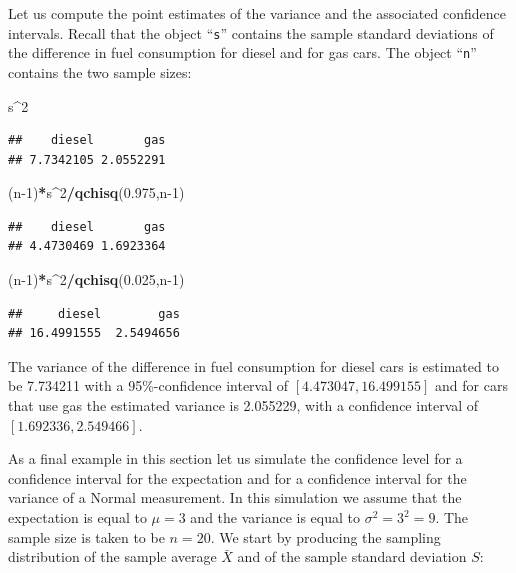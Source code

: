 \documentclass[]{krantz}
\makeatletter
\newenvironment{Shaded}{\begin{snugshade}}{\end{snugshade}}
\newcommand{\DecValTok}[1]{\textcolor[rgb]{0.00,0.00,0.81}{#1}}
\newcommand{\FloatTok}[1]{\textcolor[rgb]{0.00,0.00,0.81}{#1}}
\newcommand{\KeywordTok}[1]{\textcolor[rgb]{0.13,0.29,0.53}{\textbf{#1}}}
\newcommand{\NormalTok}[1]{#1}
\newcommand{\OperatorTok}[1]{\textcolor[rgb]{0.81,0.36,0.00}{\textbf{#1}}}
\newenvironment{kframe}{%
\medskip{}
\setlength{\fboxsep}{.8em}
 \def\at@end@of@kframe{}%
 \ifinner\ifhmode%
  \def\at@end@of@kframe{\end{minipage}}%
  \begin{minipage}{\columnwidth}%
 \fi\fi%
 \def\FrameCommand##1{\hskip\@totalleftmargin \hskip-\fboxsep
 \colorbox{shadecolor}{##1}\hskip-\fboxsep
     \hskip-\linewidth \hskip-\@totalleftmargin \hskip\columnwidth}%
 \MakeFramed {\advance\hsize-\width
   \@totalleftmargin\z@ \linewidth\hsize
   \@setminipage}}%
 {\par\unskip\endMakeFramed%
 \at@end@of@kframe}
\renewenvironment{Shaded}{\begin{kframe}}{\end{kframe}}
\theoremstyle{definition}
\theoremstyle{definition}
\theoremstyle{definition}
\theoremstyle{remark}
\makeatother
\begin{document}
Let us compute the point estimates of the variance and the associated
confidence intervals. Recall that the object ``\texttt{s}'' contains the sample
standard deviations of the difference in fuel consumption for diesel and
for gas cars. The object ``\texttt{n}'' contains the two sample sizes:

\begin{Shaded}
\begin{Highlighting}[]
\NormalTok{s}\OperatorTok{^}\DecValTok{2}
\end{Highlighting}
\end{Shaded}

\begin{verbatim}
##    diesel       gas 
## 7.7342105 2.0552291
\end{verbatim}

\begin{Shaded}
\begin{Highlighting}[]
\NormalTok{(n}\DecValTok{-1}\NormalTok{)}\OperatorTok{*}\NormalTok{s}\OperatorTok{^}\DecValTok{2}\OperatorTok{/}\KeywordTok{qchisq}\NormalTok{(}\FloatTok{0.975}\NormalTok{,n}\DecValTok{-1}\NormalTok{)}
\end{Highlighting}
\end{Shaded}

\begin{verbatim}
##    diesel       gas 
## 4.4730469 1.6923364
\end{verbatim}

\begin{Shaded}
\begin{Highlighting}[]
\NormalTok{(n}\DecValTok{-1}\NormalTok{)}\OperatorTok{*}\NormalTok{s}\OperatorTok{^}\DecValTok{2}\OperatorTok{/}\KeywordTok{qchisq}\NormalTok{(}\FloatTok{0.025}\NormalTok{,n}\DecValTok{-1}\NormalTok{)}
\end{Highlighting}
\end{Shaded}

\begin{verbatim}
##     diesel        gas 
## 16.4991555  2.5494656
\end{verbatim}

The variance of the difference in fuel consumption for diesel cars is
estimated to be 7.734211 with a 95\%-confidence interval of
\([4.473047, 16.499155]\) and for cars that use gas the estimated variance
is 2.055229, with a confidence interval of \([1.692336, 2.549466]\).

As a final example in this section let us simulate the confidence level
for a confidence interval for the expectation and for a confidence
interval for the variance of a Normal measurement. In this simulation we
assume that the expectation is equal to \(\mu = 3\) and the variance is
equal to \(\sigma^2 = 3^2 = 9\). The sample size is taken to be \(n=20\). We
start by producing the sampling distribution of the sample average
\(\bar X\) and of the sample standard deviation \(S\):
\end{document}
